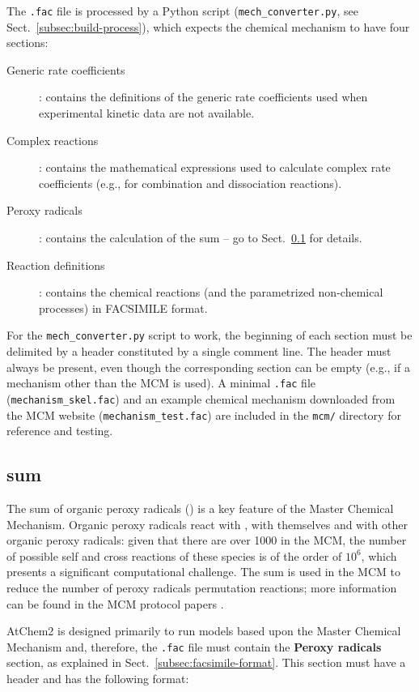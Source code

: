 The \texttt{.fac} file is processed by a Python script
(\texttt{mech\_converter.py}, see Sect.~\ref{subsec:build-process}),
which expects the chemical mechanism to have four sections:

\begin{description}
\item[Generic rate coefficients] : contains the definitions of the
  generic rate coefficients used when experimental kinetic data are
  not available.
\item[Complex reactions] : contains the mathematical expressions used
  to calculate complex rate coefficients (e.g., for combination and
  dissociation reactions).
\item[Peroxy radicals] : contains the calculation of the  sum
  -- go to Sect.~\ref{subsec:ro2-sum} for details.
\item[Reaction definitions] : contains the chemical reactions (and the
  parametrized non-chemical processes) in FACSIMILE format.
\end{description}

For the \texttt{mech\_converter.py} script to work, the beginning of
each section must be delimited by a header constituted by a single
comment line.  The header must always be present, even though the
corresponding section can be empty (e.g., if a mechanism other than
the MCM is used). A minimal \texttt{.fac} file
(\texttt{mechanism\_skel.fac}) and an example chemical mechanism
downloaded from the MCM website (\texttt{mechanism\_test.fac}) are
included in the \texttt{mcm/} directory for reference and testing.

\subsection{ sum} \label{subsec:ro2-sum}

The sum of organic peroxy radicals () is a key feature of the
Master Chemical Mechanism. Organic peroxy radicals react with
, with themselves and with other organic peroxy radicals:
given that there are over 1000  in the MCM, the number of
possible self and cross reactions of these species is of the order of
$10^6$, which presents a significant computational challenge. The
 sum is used in the MCM to reduce the number of peroxy
radicals permutation reactions; more information can be found in the
MCM protocol papers \citep{jenkin_1997, saunders_2003}.

AtChem2 is designed primarily to run models based upon the Master
Chemical Mechanism and, therefore, the \texttt{.fac} file must contain
the \textbf{Peroxy radicals} section, as explained in
Sect.~\ref{subsec:facsimile-format}. This section must have a header
and has the following format:

